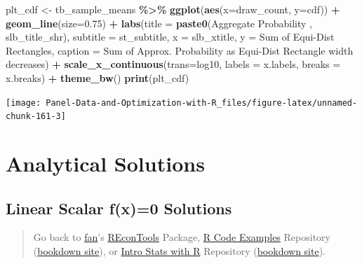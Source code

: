 \documentclass[
]{book}
\newenvironment{Shaded}{\begin{snugshade}}{\end{snugshade}}
\newcommand{\DataTypeTok}[1]{\textcolor[rgb]{0.13,0.29,0.53}{#1}}
\newcommand{\FloatTok}[1]{\textcolor[rgb]{0.00,0.00,0.81}{#1}}
\newcommand{\KeywordTok}[1]{\textcolor[rgb]{0.13,0.29,0.53}{\textbf{#1}}}
\newcommand{\NormalTok}[1]{#1}
\newcommand{\OperatorTok}[1]{\textcolor[rgb]{0.81,0.36,0.00}{\textbf{#1}}}
\newcommand{\StringTok}[1]{\textcolor[rgb]{0.31,0.60,0.02}{#1}}
\begin{document}
\begin{Shaded}
\begin{Highlighting}[]
\NormalTok{plt\_cdf \textless{}{-}}\StringTok{ }\NormalTok{tb\_sample\_means }\OperatorTok{\%\textgreater{}\%}
\StringTok{  }\KeywordTok{ggplot}\NormalTok{(}\KeywordTok{aes}\NormalTok{(}\DataTypeTok{x=}\NormalTok{draw\_count, }\DataTypeTok{y=}\NormalTok{cdf)) }\OperatorTok{+}
\StringTok{  }\KeywordTok{geom\_line}\NormalTok{(}\DataTypeTok{size=}\FloatTok{0.75}\NormalTok{) }\OperatorTok{+}
\StringTok{  }\KeywordTok{labs}\NormalTok{(}\DataTypeTok{title =} \KeywordTok{paste0}\NormalTok{(}\StringTok{\textquotesingle{}Aggregate Probability \textquotesingle{}}\NormalTok{, slb\_title\_shr),}
       \DataTypeTok{subtitle =}\NormalTok{ st\_subtitle,}
       \DataTypeTok{x =}\NormalTok{ slb\_xtitle,}
       \DataTypeTok{y =} \StringTok{\textquotesingle{}Sum of Equi{-}Dist Rectangles\textquotesingle{}}\NormalTok{,}
       \DataTypeTok{caption =} \StringTok{\textquotesingle{}Sum of Approx. Probability as Equi{-}Dist Rectangle width decreases\textquotesingle{}}\NormalTok{) }\OperatorTok{+}
\StringTok{  }\KeywordTok{scale\_x\_continuous}\NormalTok{(}\DataTypeTok{trans=}\StringTok{\textquotesingle{}log10\textquotesingle{}}\NormalTok{, }\DataTypeTok{labels =}\NormalTok{ x.labels, }\DataTypeTok{breaks =}\NormalTok{ x.breaks) }\OperatorTok{+}
\StringTok{  }\KeywordTok{theme\_bw}\NormalTok{()}
\KeywordTok{print}\NormalTok{(plt\_cdf)}
\end{Highlighting}
\end{Shaded}

\begin{center}\texttt{[image: Panel-Data-and-Optimization-with-R\_files/figure-latex/unnamed-chunk-161-3]} \end{center}

\hypertarget{analytical-solutions}{%
\section{Analytical Solutions}\label{analytical-solutions}}

\hypertarget{linear-scalar-fx0-solutions}{%
\subsection{Linear Scalar f(x)=0 Solutions}\label{linear-scalar-fx0-solutions}}

\begin{quote}
Go back to \href{http://fanwangecon.github.io/}{fan}'s \href{https://fanwangecon.github.io/REconTools/}{REconTools} Package, \href{https://fanwangecon.github.io/R4Econ/}{R Code Examples} Repository (\href{https://fanwangecon.github.io/R4Econ/bookdown}{bookdown site}), or \href{https://fanwangecon.github.io/Stat4Econ/}{Intro Stats with R} Repository (\href{https://fanwangecon.github.io/Stat4Econ/bookdown}{bookdown site}).
\end{quote}
\end{document}
